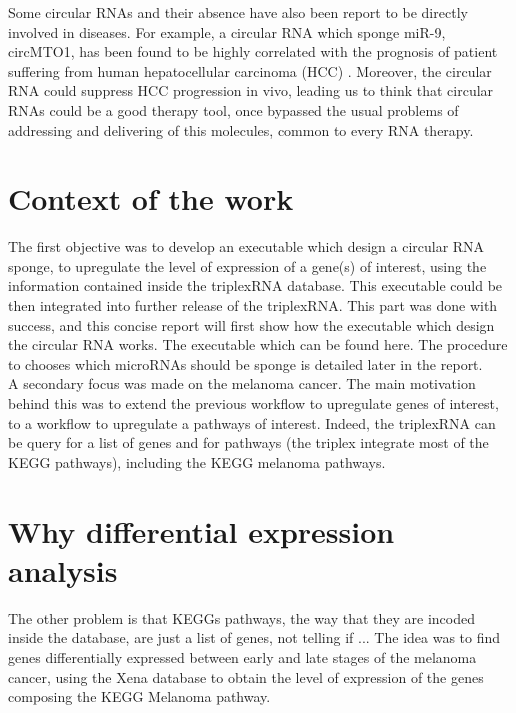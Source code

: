 \documentclass[a4paper,12pt]{report}
\begin{document}
Some circular RNAs and their absence have also been report to be directly involved in diseases. For example, a circular RNA which sponge miR-9, circMTO1, has been found to be highly  correlated with the prognosis of patient suffering from human hepatocellular carcinoma (HCC) \cite{carcinoma}. Moreover, the circular RNA could suppress HCC progression in vivo\cite{carcinoma}, leading us to think that circular RNAs could be a good therapy tool, once bypassed the usual problems of addressing and delivering of this molecules, common to every RNA therapy\cite{therapeutics}.


\section{Context of the work}

The first objective was to develop an executable which design a circular RNA sponge, to upregulate the level of expression of a gene(s) of interest, using the information contained inside the triplexRNA database. This executable could be then integrated into further release of the triplexRNA. This part was done with success, and this concise report will first show how the executable which design the circular RNA works. The executable which can be found here. The procedure to chooses which microRNAs should be sponge is detailed later in the report.\\

A secondary focus was made on the melanoma cancer.
The main motivation behind this was to extend the previous workflow to upregulate genes of interest, to a workflow to upregulate a pathways of interest.
 Indeed, the triplexRNA can be query for a list of genes and for pathways (the triplex integrate most of the KEGG pathways), including the KEGG melanoma pathways.\\

\section{Why differential expression analysis}

The other problem is that KEGGs pathways, the way that they are incoded inside the database, are just a list of genes, not telling if ...
The idea was to find genes differentially expressed between early and late stages of the melanoma cancer, using the Xena database\cite{Xena} to obtain the level of expression of the genes composing the KEGG Melanoma pathway.\\
\end{document}
